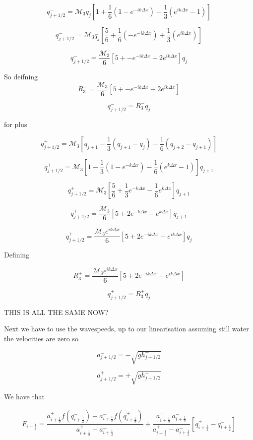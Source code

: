 \documentclass[12pt]{article}
\begin{document}
\[q^-_{j + 1/2} =\mathcal{M}_3q_j\left[1 + \frac{1}{6}\left( 1 - e^{-ik\Delta x}\right) + \frac{1}{3}\left( e^{ik\Delta x} - 1\right)\right]\]

\[q^-_{j + 1/2} =\mathcal{M}_3q_j\left[\frac{5}{6} + \frac{1}{6}\left( - e^{-ik\Delta x}\right) + \frac{1}{3}\left( e^{ik\Delta x} \right)\right]\]

\[q^-_{j + 1/2} =\frac{\mathcal{M}_3}{6}\left[5 +  - e^{-ik\Delta x} + 2e^{ik\Delta x} \right]q_j\]

So deifning 
\[R_3^-= \frac{\mathcal{M}_3}{6}\left[5 +  - e^{-ik\Delta x} + 2e^{ik\Delta x} \right]\]

\[q^-_{j + 1/2} =R_3^-q_j\]

for plus 

\[q^+_{j + 1/2} =\mathcal{M}_3\left[ q_{j+1} - \frac{1}{3}\left( q_{j+1} - q_{j}\right) - \frac{1}{6}\left( q_{j+2} - q_{j+1}\right) \right]\]

\[q^+_{j + 1/2} =\mathcal{M}_3\left[1 - \frac{1}{3}\left(1 - e^{-k\Delta x}\right) - \frac{1}{6}\left( e^{k\Delta x} - 1\right) \right]  q_{j+1}\]

\[q^+_{j + 1/2} =\mathcal{M}_3\left[\frac{5}{6} + \frac{1}{3}e^{-k\Delta x} - \frac{1}{6} e^{k\Delta x} \right]  q_{j+1}\]

\[q^+_{j + 1/2} = \frac{\mathcal{M}_3}{6}\left[5 + 2e^{-k\Delta x} - e^{k\Delta x} \right]  q_{j+1}\]

\[q^+_{j + 1/2} = \frac{\mathcal{M}_3 e^{ik\Delta x }}{6}\left[5 + 2e^{-ik\Delta x} - e^{ik\Delta x} \right]  q_{j}\]

Defining

\[R_3^+= \frac{\mathcal{M}_3 e^{ik\Delta x }}{6}\left[5 + 2e^{-ik\Delta x} - e^{ik\Delta x} \right]\] 

\[q^+_{j + 1/2} =R_3^+q_j\]


THIS IS ALL THE SAME NOW?





Next we have to use the wavespeeds, up to our linearisation assuming still water the velocities are zero so

\[a^-_{j+ 1/2} =  - \sqrt{g h^-_{j + 1/2}}\]

\[a^+_{j+ 1/2} = + \sqrt{g h^-_{j + 1/2}}\]


We have that 

\begin{gather}\label{eq:HLL_flux}
F_{i+\frac{1}{2}} = \dfrac{a^+_{i+\frac{1}{2}} f\left(q^-_{i+\frac{1}{2}}\right) - a^-_{i+\frac{1}{2}} f\left(q^+_{i+\frac{1}{2}}\right)}{a^+_{i+\frac{1}{2}} - a^-_{i+\frac{1}{2}}}  + \dfrac{a^+_{i+\frac{1}{2}} \, a^-_{i+\frac{1}{2}}}{a^+_{i+\frac{1}{2}} - a^-_{i+\frac{1}{2}}} \left [ q^+_{i+\frac{1}{2}} - q^-_{i+\frac{1}{2}} \right ]
\end{gather}
\end{document}
